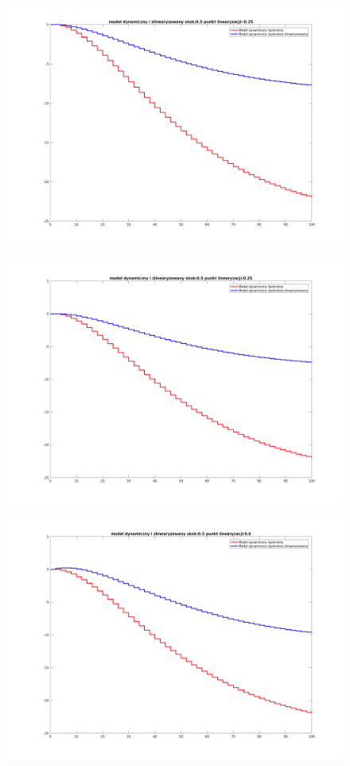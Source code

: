 \documentclass[a4paper, 11pt]{article}
\begin{document}
\begin{figure}[H]
\centering
\includegraphics[scale=0.45]{95m25.png}
\end{figure}
\begin{figure}[H]
\centering
\includegraphics[scale=0.45]{9525.png}
\end{figure}
\begin{figure}[H]
\centering
\includegraphics[scale=0.45]{956.png}
\end{figure}
\end{document}
